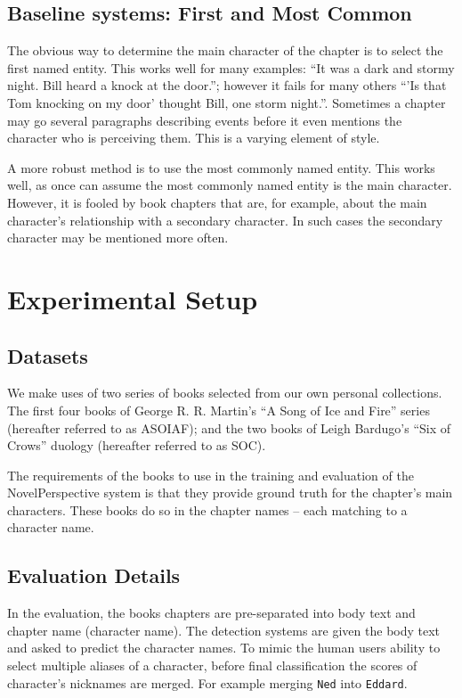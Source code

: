 \documentclass[11pt,a4paper]{article}
\begin{document}
\subsection{Baseline systems: First and Most Common}
The obvious way to determine the main character of the chapter is to select the first named entity. This works well for many examples: ``It was a dark and stormy night. Bill heard a knock at the door.''; however it fails for many others ``'Is that Tom knocking on my door' thought Bill, one storm night.''.
Sometimes a chapter may go several paragraphs describing events before it even mentions the character who is perceiving them.
This is a varying element of style.

A more robust method is to use the most commonly named entity.
This works well, as once can assume the most commonly named entity is the main character.
However, it is fooled by book chapters that are, for example, about the main character's relationship with a secondary character.
In such cases the secondary character may be mentioned more often.




\section{Experimental Setup}\label{sec:experimental-setup}
\subsection{Datasets}
We make uses of two series of books selected from our own personal collections.
The first four books of George R. R. Martin's ``A Song of Ice and Fire'' series (hereafter referred to as ASOIAF);
and the two books of  Leigh Bardugo's ``Six of Crows'' duology (hereafter referred to as SOC).

The requirements of the books to use in the training and evaluation of the NovelPerspective system is that they provide ground truth for the chapter's main characters.
These books do so in the chapter names -- each matching to a character name.

\subsection{Evaluation Details}
In the evaluation, the books chapters are pre-separated into body text and chapter name (character name).
The detection systems are given the body text and asked to predict the character names.
To mimic the human users ability to select multiple aliases of a character, before final classification the scores of character's nicknames are merged.
For example merging \texttt{Ned} into \texttt{Eddard}.
\end{document}
